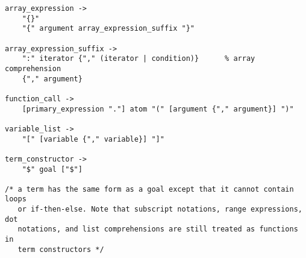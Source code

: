\begin{scriptsize}
\begin{verbatim}
array_expression ->
    "{}"
    "{" argument array_expression_suffix "}"    

array_expression_suffix ->
    ":" iterator {"," (iterator | condition)}      % array comprehension
    {"," argument} 

function_call ->
    [primary_expression "."] atom "(" [argument {"," argument}] ")"

variable_list ->
    "[" [variable {"," variable}] "]"

term_constructor ->
    "$" goal ["$"]

/* a term has the same form as a goal except that it cannot contain loops 
   or if-then-else. Note that subscript notations, range expressions, dot
   notations, and list comprehensions are still treated as functions in 
   term constructors */

\end{verbatim}
\end{scriptsize}
\ignore{

}
